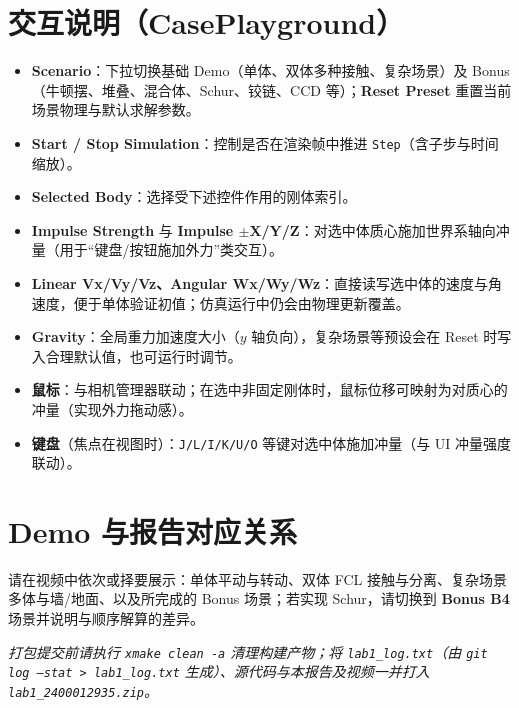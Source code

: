 \documentclass[UTF8,a4paper,11pt]{ctexart}
\begin{document}
\section{交互说明（CasePlayground）}
\begin{itemize}[leftmargin=*]
  \item \textbf{Scenario}：下拉切换基础 Demo（单体、双体多种接触、复杂场景）及 Bonus（牛顿摆、堆叠、混合体、Schur、铰链、CCD 等）；\textbf{Reset Preset} 重置当前场景物理与默认求解参数。
  \item \textbf{Start / Stop Simulation}：控制是否在渲染帧中推进 \texttt{Step}（含子步与时间缩放）。
  \item \textbf{Selected Body}：选择受下述控件作用的刚体索引。
  \item \textbf{Impulse Strength} 与 \textbf{Impulse $\pm$X/Y/Z}：对选中体质心施加世界系轴向冲量（用于“键盘/按钮施加外力”类交互）。
  \item \textbf{Linear Vx/Vy/Vz、Angular Wx/Wy/Wz}：直接读写选中体的速度与角速度，便于单体验证初值；仿真运行中仍会由物理更新覆盖。
  \item \textbf{Gravity}：全局重力加速度大小（$y$ 轴负向），复杂场景等预设会在 Reset 时写入合理默认值，也可运行时调节。
  \item \textbf{鼠标}：与相机管理器联动；在选中非固定刚体时，鼠标位移可映射为对质心的冲量（实现外力拖动感）。
  \item \textbf{键盘}（焦点在视图时）：\texttt{J/L/I/K/U/O} 等键对选中体施加冲量（与 UI 冲量强度联动）。
\end{itemize}

\section{Demo 与报告对应关系}
请在视频中依次或择要展示：单体平动与转动、双体 FCL 接触与分离、复杂场景多体与墙/地面、以及所完成的 Bonus 场景；若实现 Schur，请切换到 \textbf{Bonus B4} 场景并说明与顺序解算的差异。

\vspace{1em}
\noindent\textit{打包提交前请执行 \texttt{xmake clean -a} 清理构建产物；将 \texttt{lab1\_log.txt}（由 \texttt{git log --stat > lab1\_log.txt} 生成）、源代码与本报告及视频一并打入 \texttt{lab1\_2400012935.zip}。}
\end{document}
